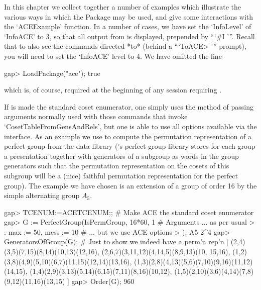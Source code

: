 

In this chapter  we  collect  together  a  number  of  examples  which
illustrate the various ways in which the {\ACE} Package may  be  used,
and give some interactions with the `ACEExample' function. In a number
of cases, we have set the `InfoLevel' of `InfoACE' to 3, so  that  all
output from {\ACE} is displayed, prepended by ```\#I  '''. Recall that
to also see the commands directed *to* {\ACE} (behind a  ```ToACE> '''
prompt), you will need to set  the  `InfoACE'  level  to  4.  We  have
omitted the line

\beginexample
gap> LoadPackage("ace");
true

\endexample

which is,  of  course,  required  at  the  beginning  of  any  session
requiring {\ACE}.


If {\ACE} is made the standard coset enumerator, one simply  uses  the
method of passing arguments normally used  with  those  commands  that
invoke `CosetTableFromGensAndRels', but one is able to use all options
available via the {\ACE} interface. As an example  we  use  {\ACE}  to
compute the permutation representation of a  perfect  group  from  the
data library ({\GAP}'s perfect group library stores for each  group  a
presentation together with generators of a subgroup as  words  in  the
group generators such  that  the  permutation  representation  on  the
cosets  of  this  subgroup  will  be  a  (nice)  faithful  permutation
representation for the perfect group). The example we have  chosen  is
an extension of a group of order 16 by the  simple  alternating  group
$A_5$.

\beginexample
gap> TCENUM:=ACETCENUM;; # Make ACE the standard coset enumerator
gap> G := PerfectGroup(IsPermGroup, 16*60, 1   # Arguments ... as per usual
>                      : max := 50, mess := 10 # ... but we use ACE options
>                      );
A5 2^4
gap> GeneratorsOfGroup(G); # Just to show we indeed have a perm'n rep'n
[ (2,4)(3,5)(7,15)(8,14)(10,13)(12,16), (2,6,7)(3,11,12)(4,14,5)(8,9,13)(10,
    15,16), (1,2)(3,8)(4,9)(5,10)(6,7)(11,15)(12,14)(13,16), 
  (1,3)(2,8)(4,13)(5,6)(7,10)(9,16)(11,12)(14,15), 
  (1,4)(2,9)(3,13)(5,14)(6,15)(7,11)(8,16)(10,12), 
  (1,5)(2,10)(3,6)(4,14)(7,8)(9,12)(11,16)(13,15) ]
gap> Order(G);
960

